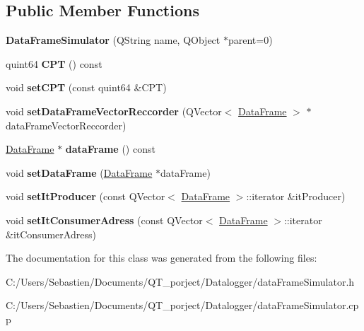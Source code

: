 \subsection*{Public Member Functions}
\begin{DoxyCompactItemize}
\item 
\mbox{\label{class_data_frame_simulator_a384daeb299f34b67f9c290965af30a84}} 
{\bfseries Data\+Frame\+Simulator} (Q\+String name, Q\+Object $\ast$parent=0)
\item 
\mbox{\label{class_data_frame_simulator_a343facc0d76bbc5ddf62b3c61518c73c}} 
quint64 {\bfseries C\+PT} () const
\item 
\mbox{\label{class_data_frame_simulator_a523d1e36774c63190191716b913647ee}} 
void {\bfseries set\+C\+PT} (const quint64 \&C\+PT)
\item 
\mbox{\label{class_data_frame_simulator_ad00a82756a80b6b5f7b6f2946cf64019}} 
void {\bfseries set\+Data\+Frame\+Vector\+Reccorder} (Q\+Vector$<$ \hyperlink{class_data_frame}{Data\+Frame} $>$ $\ast$data\+Frame\+Vector\+Reccorder)
\item 
\mbox{\label{class_data_frame_simulator_ae1289addd967edd867ddd3e1e2227598}} 
\hyperlink{class_data_frame}{Data\+Frame} $\ast$ {\bfseries data\+Frame} () const
\item 
\mbox{\label{class_data_frame_simulator_afed632cf6ea82d9c6b7adf054339fee0}} 
void {\bfseries set\+Data\+Frame} (\hyperlink{class_data_frame}{Data\+Frame} $\ast$data\+Frame)
\item 
\mbox{\label{class_data_frame_simulator_a389c2dc948ae06915afaa5ccecf031a4}} 
void {\bfseries set\+It\+Producer} (const Q\+Vector$<$ \hyperlink{class_data_frame}{Data\+Frame} $>$\+::iterator \&it\+Producer)
\item 
\mbox{\label{class_data_frame_simulator_a7b482c10bc6fb7b4be6594a2d74c3966}} 
void {\bfseries set\+It\+Consumer\+Adress} (const Q\+Vector$<$ \hyperlink{class_data_frame}{Data\+Frame} $>$\+::iterator \&it\+Consumer\+Adress)
\end{DoxyCompactItemize}


The documentation for this class was generated from the following files\+:\begin{DoxyCompactItemize}
\item 
C\+:/\+Users/\+Sebastien/\+Documents/\+Q\+T\+\_\+porject/\+Datalogger/data\+Frame\+Simulator.\+h\item 
C\+:/\+Users/\+Sebastien/\+Documents/\+Q\+T\+\_\+porject/\+Datalogger/data\+Frame\+Simulator.\+cpp\end{DoxyCompactItemize}
